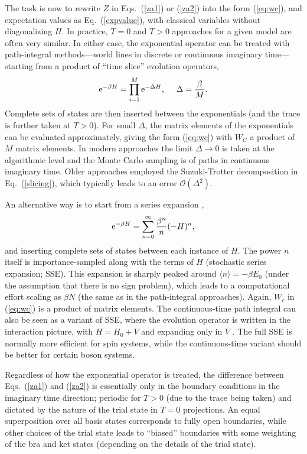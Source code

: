 \documentclass[range]{ar2e}
\begin{document}
The task is now to rewrite $Z$ in Eqs.~(\ref{za1}) or (\ref{za2}) into the form (\ref{eq:wc}), and expectation values as Eq.~(\ref{expvalue}), with classical variables 
without diagonalizing $H$. In practice, $T=0$ and $T>0$ approaches for a given model are often very similar. In either case, the exponential 
operator can be treated with path-integral methods---world lines in discrete \cite{Suzuki77,Hirsch82} or continuous \cite{Beard96,Prokofev96,Prokofev98} 
imaginary time---starting from a product of ``time slice'' evolution operators,
\begin{equation}
{\rm e}^{-\beta H}= \prod_{i=1}^M {\rm e}^{-\Delta H},~~~~ \Delta=\frac{\beta}{M}.
\label{slicing}
\end{equation}
Complete sets of states are then inserted between the exponentials (and the trace is further taken at $T>0$). For small $\Delta$, the
matrix elements of the exponentials can be evaluated approximately, giving the form (\ref{eq:wc}) with $W_C$ a product of $M$ matrix elements. 
In modern approaches the limit $\Delta \to 0$ is taken at the algorithmic level \cite{Prokofev96,WormA,Beard96} and the Monte Carlo sampling is of 
paths in continuous imaginary time. Older approaches employed the Suzuki-Trotter decomposition \cite{Suzuki76} in Eq.~(\ref{slicing}), which 
typically leads to an error $\mathcal{O}(\Delta^2)$.

An alternative way is to start from a series expansion \cite{Handscomb62,Sandvik91},
\begin{equation}
{\rm e}^{-\beta H}= \sum_{n=0}^\infty \frac{\beta^n}{n}(-H)^n,
\label{series}
\end{equation}
and inserting complete sets of states between each instance of $H$. The power $n$ itself is importance-sampled along with the terms of $H$ 
(stochastic series expansion; SSE). This expansion is sharply peaked around $\langle n\rangle = -\beta E_0$ (under the assumption that there 
is no sign problem), which leads to a computational effort scaling as $\beta N$ (the same as in the path-integral approaches). Again, $W_c$ 
in (\ref{eq:wc}) is a product of matrix elements. The continuous-time path integral can also be seen as a variant of SSE, where the evolution
operator is written in the interaction picture, with $H=H_0+V$ and expanding only in $V$ \cite{Prokofev96,Sandvik97a}. The full SSE is normally 
more efficient for spin systems, while the continuous-time variant should be better for certain boson systems.

Regardless of how the exponential operator is treated, the difference between Eqs.~(\ref{za1}) and (\ref{za2}) is essentially only in the boundary 
conditions in the imaginary time direction; periodic for $T>0$ (due to the trace being taken) and dictated by the nature of the trial state in $T=0$ 
projections. An equal superposition over all basis states corresponds to fully open boundaries, while other choices of the trial state leads to ``biased''
boundaries with some weighting of the bra and ket states (depending on the details of the trial state). 
\end{document}
